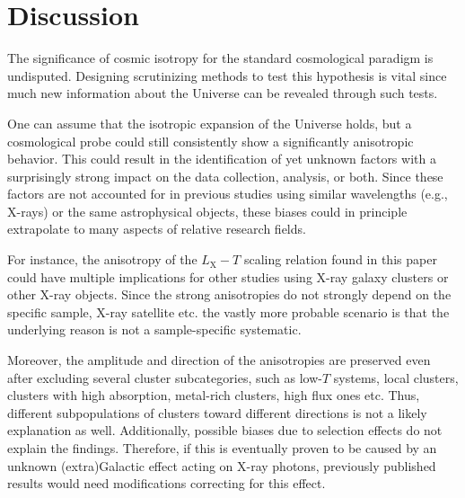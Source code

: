 \documentclass{aa}   %
\begin{document}
\section{Discussion}\label{discuss}

The significance of cosmic isotropy for the standard cosmological paradigm is undisputed. Designing scrutinizing methods to test this hypothesis is vital since much new information about the Universe can be revealed through such tests. 

One can assume that the isotropic expansion of the Universe holds, but a cosmological probe could still consistently show a significantly anisotropic behavior. This could result in the identification of yet unknown factors with a surprisingly strong impact on the data collection, analysis, or both. Since these factors are not accounted for in previous studies using similar wavelengths (e.g., X-rays) or the same astrophysical objects, these biases could in principle extrapolate to many aspects of relative research fields. 

For instance, the anisotropy of the $L_{\text{X}}-T$ scaling relation found in this paper could have multiple implications for other studies using X-ray galaxy clusters or other X-ray objects. Since the strong anisotropies do not strongly depend on the specific sample, X-ray satellite etc. the vastly more probable scenario is that the underlying reason is not a sample-specific systematic. 

Moreover, the amplitude and direction of the anisotropies are preserved even after excluding several cluster subcategories, such as low-$T$ systems, local clusters, clusters with high absorption, metal-rich clusters, high flux ones etc. Thus, different subpopulations of clusters toward different directions is not a likely explanation as well. Additionally, possible biases due to selection effects do not explain the findings. Therefore, if this is eventually proven to be caused by an unknown (extra)Galactic effect acting on X-ray photons, previously published results would need modifications correcting for this effect. 
\end{document}

